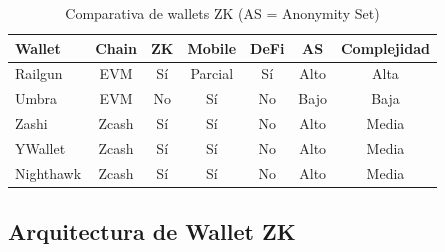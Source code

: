 \documentclass[11pt,a4paper,twoside]{book}
\theoremstyle{definition}
\theoremstyle{remark}
\begin{document}
\begin{table}[htbp]
\centering
\small
\begin{tabular}{lcccccc}
\toprule
\textbf{Wallet} & \textbf{Chain} & \textbf{ZK} & \textbf{Mobile} & \textbf{DeFi} & \textbf{AS} & \textbf{Complejidad} \\
\midrule
Railgun & EVM & Sí & Parcial & Sí & Alto & Alta \\
Umbra & EVM & No & Sí & No & Bajo & Baja \\
Zashi & Zcash & Sí & Sí & No & Alto & Media \\
YWallet & Zcash & Sí & Sí & No & Alto & Media \\
Nighthawk & Zcash & Sí & Sí & No & Alto & Media \\
\bottomrule
\end{tabular}
\caption{Comparativa de wallets ZK (AS = Anonymity Set)}
\end{table}

\subsection{Arquitectura de Wallet ZK}
\end{document}
